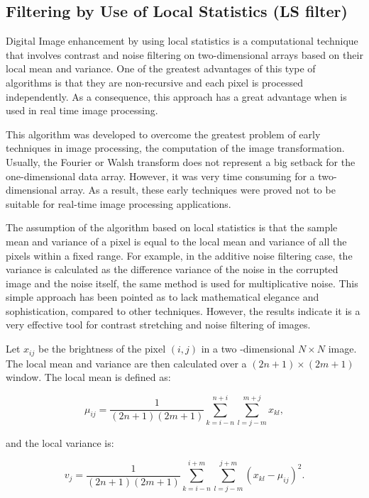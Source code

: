 \subsection{Filtering by Use of Local Statistics (LS filter)}
Digital Image enhancement by using local statistics is a computational technique that involves contrast and noise filtering on two-dimensional arrays based on their local mean and variance. One of the greatest advantages of this type of algorithms is that they are non-recursive and each pixel is processed independently. As a consequence, this approach has a great advantage when is used in real time image processing.

This algorithm was developed to overcome the greatest problem of early techniques in image processing, the computation of the image transformation. Usually, the Fourier or Walsh transform does not represent a big setback for the one-dimensional data array. However, it was very time consuming for a two-dimensional array. As a result, these early techniques were proved not to be suitable for real-time image processing applications.

The assumption of the algorithm based on local statistics is that the sample mean and variance of a pixel is equal to the local mean and variance of all the pixels within a fixed range. For example, in the additive noise filtering case, the variance is calculated as the difference variance of the noise in the corrupted image and the noise itself, the same method is used for multiplicative noise.
This simple approach has been pointed as to lack mathematical elegance and sophistication, compared to other techniques. However, the results indicate it is a very effective tool for contrast stretching and noise filtering of images.

Let $x_{ij}$ be the brightness of the pixel $(i,j)$ in a two 
-dimensional $N\times N$ image. The local mean and variance are then calculated over a $(2n+1) \times (2m+1)$ window. The local mean is defined as:

\begin{equation}
    \mu_{ij}=\dfrac{1}{(2n+1)(2m+1)}\sum_{k=i-n}^{n+i}\sum_{l=j-m}^{m+j}{x_{kl}},
    \label{eq:ls_filter_1}
\end{equation}

and the local variance is:

\begin{equation}
    v_{j} =\dfrac{1}{(2n+1)(2m+1)} \sum_{k=i-n}^{i+m}\sum_{l=j-m}^{j+m} (x_{kl} - \mu_{ij} )^2.
    \label{eq:ls_filter_2}
\end{equation}

